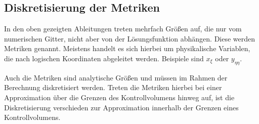 \subsection{Diskretisierung der Metriken}
\label{sec:verz-metrik}

In den oben gezeigten Ableitungen treten mehrfach Größen auf, die nur vom numerischen Gitter, nicht aber
von der Lösungsfunktion abhängen. Diese werden Metriken genannt.
Meistens handelt es sich hierbei um physikalische Variablen, die nach logischen Koordinaten abgeleitet werden.
Beispiele sind $x_{\xi}$ oder $y_{\eta\eta}$.

Auch die Metriken sind analytische Größen und müssen im Rahmen der Berechnung diskretisiert werden.
Treten die Metriken hierbei bei einer Approximation über die Grenzen des Kontrollvolumens hinweg auf,
ist die Diskretisierung verschieden zur Approximation innerhalb der Grenzen eines Kontrollvolumens.

